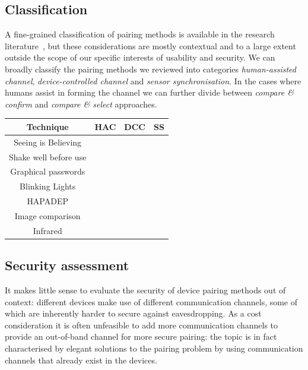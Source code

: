 \documentclass[conference, 11pt]{sty/IEEEtran}
\begin{document}
\subsection{Classification}
A fine-grained classification of pairing methods is available in the research literature~\cite{chong2012usability}, but these considerations are mostly contextual and to a large extent outside the scope of our specific interests of usability and security.
We can broadly classify the pairing methods we reviewed into categories \emph{human-assisted channel}, \emph{device-controlled channel} and \emph{sensor synchronisation}.
In the cases where humans assist in forming the channel we can further divide between \textit{compare \& confirm} and \textit{compare \& select} approaches.

\begin{tabular}{c|c|c|c}
	Technique & HAC & DCC & SS \\
	\hline
	  Seeing is Believing &  & \checkmark &   \\
	Shake well before use &  &  & \checkmark \\
    	  Graphical passwords & \checkmark &  &  \\
	   Blinking Lights & \checkmark &  & \\
	 HAPADEP &  & \checkmark & \checkmark \\
	Image comparison & \checkmark &  & \\
	Infrared &  & \checkmark &  \\
\end{tabular}

\subsection{Security assessment}
\label{ssec:security_assessment}

It makes little sense to evaluate the security of device pairing methods out of context: different devices make use of different communication channels, some of which are inherently harder to secure against eavesdropping.
As a cost consideration it is often unfeasible to add more communication channels to provide an out-of-band channel for more secure pairing: the topic is in fact characterised by elegant solutions to the pairing problem by using communication channels that already exist in the devices.
\end{document}
